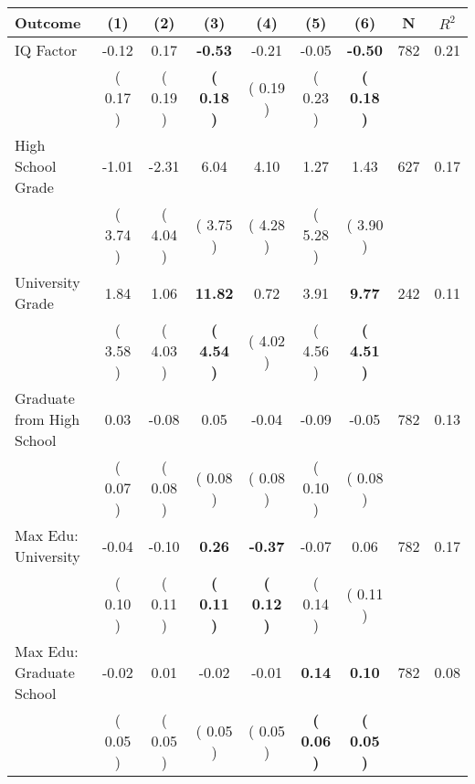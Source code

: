 \begin{tabular}{lcccccccc}
\toprule
 \textbf{Outcome} & \textbf{(1)} & \textbf{(2)} & \textbf{(3)} & \textbf{(4)} & \textbf{(5)} & \textbf{(6)} & \textbf{N} & \textbf{$ R^2$} \\
\midrule
IQ Factor &     -0.12 &      0.17 & \textbf{    -0.53} &     -0.21 &     -0.05 & \textbf{    -0.50} & 782 &       0.21 \\ 
 & (     0.17 ) & (     0.19 ) & \textbf{(     0.18 )} & (     0.19 ) & (     0.23 ) & \textbf{(     0.18 )} & \\
High School Grade &     -1.01 &     -2.31 &      6.04 &      4.10 &      1.27 &      1.43 & 627 &       0.17 \\ 
 & (     3.74 ) & (     4.04 ) & (     3.75 ) & (     4.28 ) & (     5.28 ) & (     3.90 ) & \\
University Grade &      1.84 &      1.06 & \textbf{    11.82} &      0.72 &      3.91 & \textbf{     9.77} & 242 &       0.11 \\ 
 & (     3.58 ) & (     4.03 ) & \textbf{(     4.54 )} & (     4.02 ) & (     4.56 ) & \textbf{(     4.51 )} & \\
Graduate from High School &      0.03 &     -0.08 &      0.05 &     -0.04 &     -0.09 &     -0.05 & 782 &       0.13 \\ 
 & (     0.07 ) & (     0.08 ) & (     0.08 ) & (     0.08 ) & (     0.10 ) & (     0.08 ) & \\
Max Edu: University &     -0.04 &     -0.10 & \textbf{     0.26} & \textbf{    -0.37} &     -0.07 &      0.06 & 782 &       0.17 \\ 
 & (     0.10 ) & (     0.11 ) & \textbf{(     0.11 )} & \textbf{(     0.12 )} & (     0.14 ) & (     0.11 ) & \\
Max Edu: Graduate School &     -0.02 &      0.01 &     -0.02 &     -0.01 & \textbf{     0.14} & \textbf{     0.10} & 782 &       0.08 \\ 
 & (     0.05 ) & (     0.05 ) & (     0.05 ) & (     0.05 ) & \textbf{(     0.06 )} & \textbf{(     0.05 )} & \\
\bottomrule
\end{tabular}
